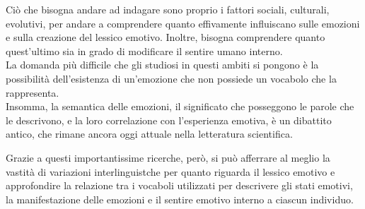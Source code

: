 Ciò che bisogna andare ad indagare sono proprio i fattori sociali, culturali, evolutivi, per andare a comprendere quanto effivamente influiscano sulle emozioni e sulla creazione del lessico emotivo. Inoltre, bisogna comprendere quanto quest'ultimo sia in grado di modificare il sentire umano interno. \\
La domanda più difficile che gli studiosi in questi ambiti si pongono è la possibilità dell'esistenza di un'emozione che non possiede un vocabolo che la rappresenta. \\
Insomma, la semantica delle emozioni, il significato che posseggono le parole che le descrivono, e la loro correlazione con l'esperienza emotiva, è un dibattito antico, che rimane ancora oggi attuale nella letteratura scientifica. 

Grazie a questi importantissime ricerche, però, si può afferrare al meglio la vastità di variazioni interlinguistche per quanto riguarda il lessico emotivo e approfondire la relazione tra i vocaboli utilizzati per descrivere gli stati emotivi, la manifestazione delle emozioni e il sentire emotivo interno a ciascun individuo.

